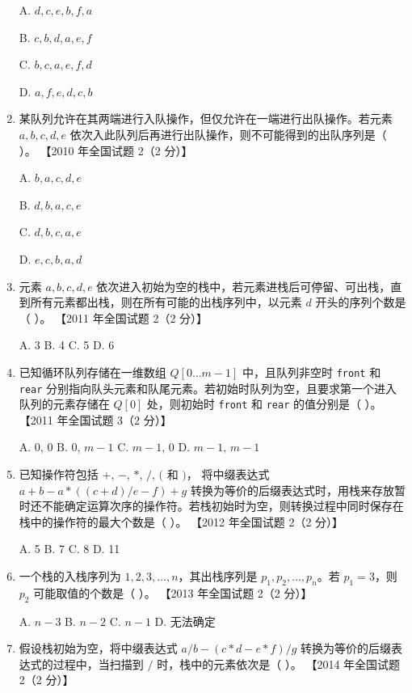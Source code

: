 \documentclass[lang=cn,newtx,10pt,scheme=chinese]{elegantbook}
\begin{document}
\begin{enumerate}
    A. $d, c, e, b,f, a$  

    B. $c, b, d, a, e,f$  

    C. $b,c, a, e,f, d $  

    D. $a,f,e,d,c,b$  

    \item 某队列允许在其两端进行入队操作，但仅允许在一端进行出队操作。若元素 $a, b, c, d, e$ 依次入此队列后再进行出队操作，则不可能得到的出队序列是（ ）。  
    【2010 年全国试题 2（2 分）】  

    A. $b, a, c, d, e$  

    B. $d, b, a, c, e$  

    C. $d,b,c,a,e$  

    D. $e, c, b, a, d$  

    \item 元素 $a, b, c, d, e$ 依次进入初始为空的栈中，若元素进栈后可停留、可出栈，直到所有元素都出栈，则在所有可能的出栈序列中，以元素 $d$ 开头的序列个数是（ ）。  
    【2011 年全国试题 2（2 分）】  

    A. 3 \quad B. 4 \quad C. 5 \quad D. 6  

    \item 已知循环队列存储在一维数组 $Q[0 \ldots m-1]$ 中，且队列非空时 \texttt{front} 和 \texttt{rear} 分别指向队头元素和队尾元素。若初始时队列为空，且要求第一个进入队列的元素存储在 $Q[0]$ 处，则初始时 \texttt{front} 和 \texttt{rear} 的值分别是（ ）。  
    【2011 年全国试题 3（2 分）】  

    A. 0, 0 \quad B. 0, $m-1$ \quad C. $m-1$, 0 \quad D. $m-1$, $m-1$  

    \item 已知操作符包括 $+$, $-$, $*$, $/$, $($ 和 $)$，
    将中缀表达式 $a+b-a*((c+d)/e-f)+g$ 转换为等价的后缀表达式时，用栈来存放暂时还不能确定运算次序的操作符。若栈初始时为空，则转换过程中同时保存在栈中的操作符的最大个数是（ ）。  
    【2012 年全国试题 2（2 分）】

    A. 5 \quad B. 7 \quad C. 8 \quad D. 11  

    \item 一个栈的入栈序列为 $1, 2, 3, \ldots, n$，其出栈序列是 $p_1, p_2, \ldots, p_n$。若 $p_1 = 3$，则 $p_2$ 可能取值的个数是（ ）。  
    【2013 年全国试题 2（2 分）】 

    A. $n-3$ \quad B. $n-2$ \quad C. $n-1$ \quad D. 无法确定  

    \item 假设栈初始为空，将中缀表达式 $a/b-(c*d-e*f)/g$ 转换为等价的后缀表达式的过程中，当扫描到 $/$ 时，栈中的元素依次是（ ）。  
    【2014 年全国试题 2（2 分）】  


\end{enumerate}
\end{document}
